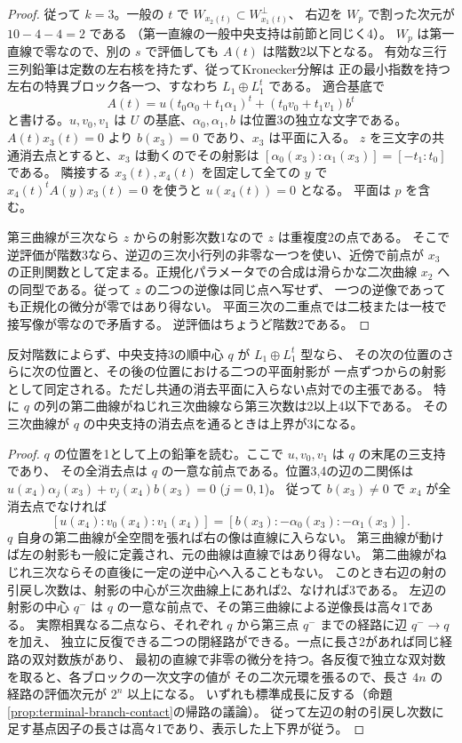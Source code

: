 \begin{proof}
従って $k=3$。一般の $t$ で $W_{x_2(t)}\subset W_{x_1(t)}^\perp$、
右辺を $W_p$ で割った次元が $10-4-4=2$ である
（第一直線の一般中央支持は前節と同じく4）。
$W_p$ は第一直線で零なので、別の $s$ で評価しても $A(t)$ は階数2以下となる。
有効な三行三列鉛筆は定数の左右核を持たず、従ってKronecker分解は
正の最小指数を持つ左右の特異ブロック各一つ、すなわち $L_1\oplus L_1^t$ である。
適合基底で
\[
 A(t)=u(t_0\alpha_0+t_1\alpha_1)^t+(t_0v_0+t_1v_1)b^t
\]
と書ける。$u,v_0,v_1$ は $U$ の基底、$\alpha_0,\alpha_1,b$ は位置3の独立な文字である。
$A(t)x_3(t)=0$ より $b(x_3)=0$ であり、$x_3$ は平面に入る。
$z$ を三文字の共通消去点とすると、$x_3$ は動くのでその射影は
$[\alpha_0(x_3):\alpha_1(x_3)]=[-t_1:t_0]$ である。
隣接する $x_3(t),x_4(t)$ を固定して全ての $y$ で
$x_4(t)^t A(y)x_3(t)=0$ を使うと $u(x_4(t))=0$ となる。
平面は $p$ を含む。

第三曲線が三次なら $z$ からの射影次数1なので $z$ は重複度2の点である。
そこで逆評価が階数3なら、逆辺の三次小行列の非零な一つを使い、近傍で前点が
$x_3$ の正則関数として定まる。正規化パラメータでの合成は滑らかな二次曲線
$x_2$ への同型である。従って $z$ の二つの逆像は同じ点へ写せず、
一つの逆像であっても正規化の微分が零ではあり得ない。
平面三次の二重点では二枝または一枝で接写像が零なので矛盾する。
逆評価はちょうど階数2である。
\end{proof}

\begin{proposition}\label{prop:singular-ternary-center-projections}
反対階数によらず、中央支持3の順中心 $q$ が $L_1\oplus L_1^t$ 型なら、
その次の位置のさらに次の位置と、その後の位置における二つの平面射影が
一点ずつからの射影として同定される。ただし共通の消去平面に入らない点対での主張である。
特に $q$ の列の第二曲線がねじれ三次曲線なら第三次数は2以上4以下である。
その三次曲線が $q$ の中央支持の消去点を通るときは上界が3になる。
\end{proposition}
\begin{proof}
$q$ の位置を1として上の鉛筆を読む。ここで $u,v_0,v_1$ は $q$ の末尾の三支持であり、
その全消去点は $q$ の一意な前点である。位置3,4の辺の二関係は
$u(x_4)\alpha_j(x_3)+v_j(x_4)b(x_3)=0$ ($j=0,1$)。
従って $b(x_3)\ne0$ で $x_4$ が全消去点でなければ
\[
 [u(x_4):v_0(x_4):v_1(x_4)]
       =[b(x_3):-\alpha_0(x_3):-\alpha_1(x_3)].
\]
$q$ 自身の第二曲線が全空間を張れば右の像は直線に入らない。
第三曲線が動けば左の射影も一般に定義され、元の曲線は直線ではあり得ない。
第二曲線がねじれ三次ならその直後に一定の逆中心へ入ることもない。
このとき右辺の射の引戻し次数は、射影の中心が三次曲線上にあれば2、なければ3である。
左辺の射影の中心 $q^-$ は $q$ の一意な前点で、その第三曲線による逆像長は高々1である。
実際相異なる二点なら、それぞれ $q$ から第三点 $q^-$ までの経路に辺 $q^-\to q$ を加え、
独立に反復できる二つの閉経路ができる。一点に長さ2があれば同じ経路の双対数族があり、
最初の直線で非零の微分を持つ。各反復で独立な双対数を取ると、各ブロックの一次文字の値が
その二次元環を張るので、長さ $4n$ の経路の評価次元が $2^n$ 以上になる。
いずれも標準成長に反する（命題\ref{prop:terminal-branch-contact}の帰路の議論）。
従って左辺の射の引戻し次数に足す基点因子の長さは高々1であり、表示した上下界が従う。
\end{proof}
